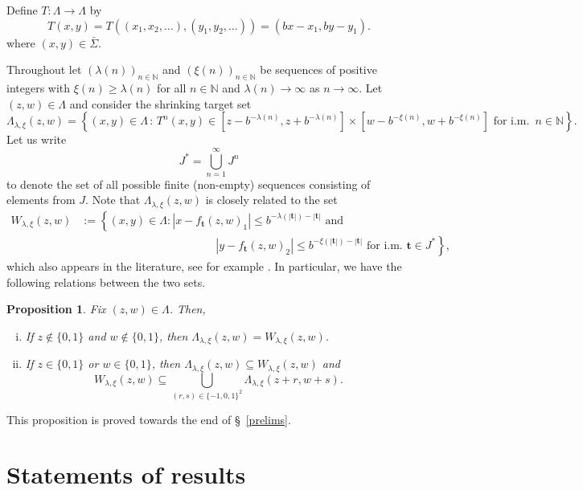 \documentclass[12pt]{article}
\newtheorem{proposition}[definition]{Proposition}
\theoremstyle{remark}
\numberwithin{equation}{section}
\renewcommand{\Bbb}[1]{\mathbb{#1}}
\newcommand{\N}{{\Bbb N}}         %
\newcommand{\bt}{\mathbf{t}}
\newcommand{\0}{\mathbf{0}}
\begin{document}
Define $T:\Lambda \to \Lambda$ \label{T definition} by
\begin{equation*}
    T(x,y) = T((x_1,x_2,\dots), (y_1,y_2,\dots)) =   (bx-x_1, by-y_1).
\end{equation*}
where $(x,y) \in \bar{\Sigma}$.

Throughout let $(\lambda(n))_{n \in \N}$ and $(\xi(n))_{n \in \N}$ be sequences of positive integers with $\xi(n) \geq \lambda(n)$ for all $n \in \N$ and $\lambda(n) \to \infty$ as $n \to \infty$. Let $(z,w) \in \Lambda$ and consider the shrinking target set
\begin{equation*}
    \Lambda_{\lambda,\xi}(z,w) = \left\{ (x,y) \in \Lambda \, : \, T^{n}(x,y) \in [z-b^{-\lambda(n)},z+b^{-\lambda(n)}]\times [w-b^{-\xi(n)}, w+b^{-\xi(n)}] \text{ for i.m. } \, n \in \N \right\}.
\end{equation*}
Let us write
\[J^* = \bigcup_{n=1}^{\infty}{J^n}\]
to denote the set of all possible finite (non-empty) sequences consisting of elements from $J$.
Note that $\Lambda_{\lambda,\xi}(z,w)$ is closely related to the set 
\begin{align} \label{W set}
W_{\lambda,\xi}(z,w)&:=\left\{(x,y) \in \Lambda: \left|x-f_{\bt}(z,w)_1\right|\leq b^{-\lambda(|\bt|)-|\bt|} \text{ and }\right. \nonumber \\ 
&\phantom{=========}\left. \left|y-f_{\bt}(z,w)_2\right|\leq b^{-\xi(|\bt|)-|\bt|} \text{ for i.m. } \bt \in J^*\right\},
\end{align}
which also appears in the literature, see for example \cite{AllenBarany,WangWu}. In particular, we have the following {relations between} the two sets.

\begin{proposition} \label{relationship between sets}
Fix $(z,w)\in\Lambda$. {Then,}
\begin{enumerate}[(i)]
\item If $z \not\in \{0,1\}$ and $w \not\in \{0,1\}$, then $\Lambda_{\lambda,\xi}(z,w)=W_{\lambda,\xi}(z,w)$.
\item If $z \in \{0,1\}$ or $w \in \{0,1\}$, then $\Lambda_{\lambda,\xi}(z,w) \subseteq W_{\lambda,\xi}(z,w)$ and \[W_{\lambda,\xi}(z,w) \subseteq \bigcup_{(r,s)\in\{-1,0,1\}^2} \Lambda_{\lambda,\xi}(z+r,w+s).\]
\end{enumerate}
\end{proposition}
This proposition is proved towards the end of \S~\ref{prelims}.

\section{Statements of results} \label{statement of results}
\end{document}
